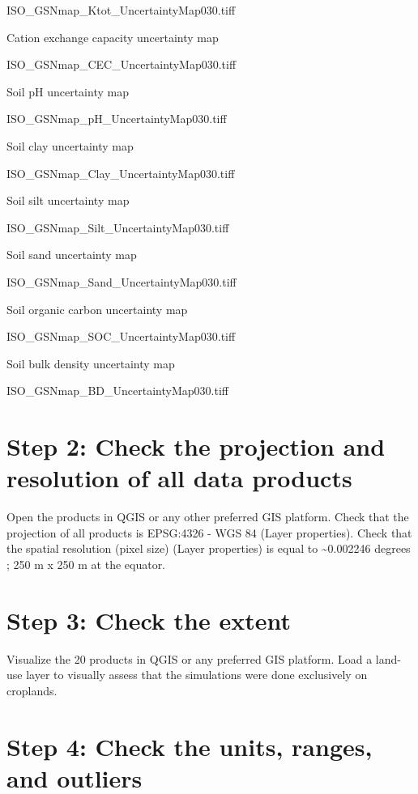 \documentclass[
  10pt,
  b5paper,
  oneside]{book}
\begin{document}
ISO\_GSNmap\_Ktot\_UncertaintyMap030.tiff

Cation exchange capacity uncertainty map

ISO\_GSNmap\_CEC\_UncertaintyMap030.tiff

Soil pH uncertainty map

ISO\_GSNmap\_pH\_UncertaintyMap030.tiff

Soil clay uncertainty map

ISO\_GSNmap\_Clay\_UncertaintyMap030.tiff

Soil silt uncertainty map

ISO\_GSNmap\_Silt\_UncertaintyMap030.tiff

Soil sand uncertainty map

ISO\_GSNmap\_Sand\_UncertaintyMap030.tiff

Soil organic carbon uncertainty map

ISO\_GSNmap\_SOC\_UncertaintyMap030.tiff

Soil bulk density uncertainty map

ISO\_GSNmap\_BD\_UncertaintyMap030.tiff

\hypertarget{step-2-check-the-projection-and-resolution-of-all-data-products}{%
\section*{Step 2: Check the projection and resolution of all data products}\label{step-2-check-the-projection-and-resolution-of-all-data-products}}

Open the products in QGIS or any other preferred GIS platform. Check that the projection of all products is EPSG:4326 - WGS 84 (Layer properties). Check that the spatial resolution (pixel size) (Layer properties) is equal to \textasciitilde0.002246 degrees ; 250 m x 250 m at the equator.

\hypertarget{step-3-check-the-extent}{%
\section*{Step 3: Check the extent}\label{step-3-check-the-extent}}

Visualize the 20 products in QGIS or any preferred GIS platform. Load a land-use layer to visually assess that the simulations were done exclusively on croplands.

\hypertarget{step-4-check-the-units-ranges-and-outliers}{%
\section*{Step 4: Check the units, ranges, and outliers}\label{step-4-check-the-units-ranges-and-outliers}}
\end{document}
